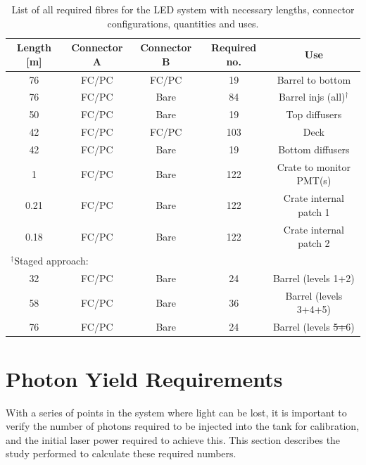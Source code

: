 \documentclass[a4paper,11pt]{article}
\providecommand{\DIFaddtex}[1]{{\protect\color{blue}\uwave{#1}}} %
\providecommand{\DIFdeltex}[1]{{\protect\color{red}\sout{#1}}}                      %
\providecommand{\DIFaddFL}[1]{\DIFadd{#1}} %
\providecommand{\DIFdelFL}[1]{\DIFdel{#1}} %
\providecommand{\DIFaddbeginFL}{} %
\providecommand{\DIFaddendFL}{} %
\providecommand{\DIFdelbeginFL}{} %
\providecommand{\DIFdelendFL}{} %
\providecommand{\DIFadd}[1]{\texorpdfstring{\DIFaddtex{#1}}{#1}} %
\providecommand{\DIFdel}[1]{\texorpdfstring{\DIFdeltex{#1}}{}} %
\newcommand{\DIFscaledelfig}{0.5}
\newlength{\DIFdelgraphicswidth} %
\newlength{\DIFdelgraphicsheight} %
\newcommand{\DIFaddincludegraphics}[2][]{{\color{blue}\fbox{\DIFOincludegraphics[#1]{#2}}}} %
\newcommand{\DIFdelincludegraphics}[2][]{%
\sbox{\DIFdelgraphicsbox}{\DIFOincludegraphics[#1]{#2}}%
\settoboxwidth{\DIFdelgraphicswidth}{\DIFdelgraphicsbox} %
\settoboxtotalheight{\DIFdelgraphicsheight}{\DIFdelgraphicsbox} %
\scalebox{\DIFscaledelfig}{%
\parbox[b]{\DIFdelgraphicswidth}{\usebox{\DIFdelgraphicsbox}\\[-\baselineskip] \rule{\DIFdelgraphicswidth}{0em}}\llap{\resizebox{\DIFdelgraphicswidth}{\DIFdelgraphicsheight}{%
\setlength{\unitlength}{\DIFdelgraphicswidth}%
\begin{picture}(1,1)%
\thicklines\linethickness{2pt} %
{\color[rgb]{1,0,0}\put(0,0){\framebox(1,1){}}}%
{\color[rgb]{1,0,0}\put(0,0){\line( 1,1){1}}}%
{\color[rgb]{1,0,0}\put(0,1){\line(1,-1){1}}}%
\end{picture}%
}\hspace*{3pt}}} %
} %
\DeclareRobustCommand{\DIFaddbeginFL}{\DIFOaddbeginFL \let\includegraphics\DIFaddincludegraphics} %
\DeclareRobustCommand{\DIFaddendFL}{\DIFOaddendFL \let\includegraphics\DIFOincludegraphics} %
\DeclareRobustCommand{\DIFdelbeginFL}{\DIFOdelbeginFL \let\includegraphics\DIFdelincludegraphics} %
\DeclareRobustCommand{\DIFdelendFL}{\DIFOaddendFL \let\includegraphics\DIFOincludegraphics} %
\begin{document}
\begin{table}[h]
\centering
\setlength{\tabcolsep}{4pt}
\begin{tabular}{ccccc}
\toprule
Length [m]	&	Connector A	&	Connector B	&	Required no.	&	Use		\\ \midrule
76			&	FC/PC		&	FC/PC		&	19				&	Barrel to bottom	\\
76			&	FC/PC		&	Bare		&	84				&	Barrel injs (all)$^\dagger$	\\
50			&	FC/PC		&	Bare		&	19				&	Top diffusers \\
42			&	FC/PC		&	FC/PC		&	103				&	Deck		\\
42			&	FC/PC		&	Bare		&	19				&	Bottom diffusers	\\
1			&	FC/PC		&	Bare		&	122				&	Crate to monitor PMT(s)	\\
0.21		&	FC/PC		&	Bare		&	122				&	Crate internal patch 1	\\
0.18		&	FC/PC		&	Bare		&	122				&	Crate internal patch 2 \\ \midrule\multicolumn{3}{l}{$^\dagger$Staged approach:}&					&			\\
32			&	FC/PC		&	Bare		&	24				&	Barrel (levels 1+2) \\
58			&	FC/PC		&	Bare		&	36				&	Barrel (levels 3+4+5)	\\
76			&	FC/PC		&	Bare		&	24				&	Barrel (levels \DIFdelbeginFL \DIFdelFL{5+}\DIFdelendFL 6\DIFaddbeginFL \DIFaddFL{+7}\DIFaddendFL )	\\
\bottomrule
\end{tabular}
\caption{List of all required fibres for the LED system with necessary lengths, connector configurations, quantities and uses.}\label{tab:fibreSummaryLED}
\end{table}



\clearpage

\section{Photon Yield Requirements}\label{sec:photonreq}

With a series of points in the system where light can be lost, it is important to verify the number of photons required to be injected into the tank for calibration, and the initial laser power required to achieve this. This section describes the study performed to calculate these required numbers.
\end{document}
